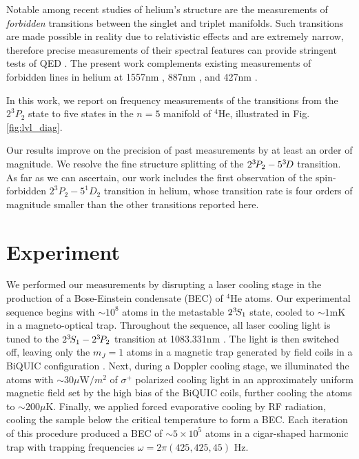   Notable among recent studies of helium's structure are the measurements of \emph{forbidden} transitions between the singlet and triplet manifolds.
	Such transitions are made possible in reality due to relativistic effects and are extremely narrow, therefore precise measurements of their spectral features can provide stringent tests of QED \cite{Lach01}.
	The present work complements existing measurements of forbidden lines in helium at 1557nm \cite{Rooij11,Rengelink18}, 887nm \cite{Notermans14}, and 427nm \cite{Thomas20}.

  In this work, we report on frequency measurements of the transitions from the $2^3P_2$ state to five states in the $n=5$ manifold of $^4$He, illustrated in Fig.
	\ref{fig:lvl_diag}.
	
  Our results improve on the precision of past measurements \cite{Martin60} by at least an order of magnitude.
  We resolve the fine structure splitting of the $2^{3\!}P_2 - 5^{3\!} D$ transition.
	As far as we can ascertain, our work includes the first observation of the spin-forbidden $2^3P_2 - 5^1D_2$ transition in helium, whose transition rate is four orders of magnitude smaller than the other transitions reported here.

  

\section{Experiment}

We performed our measurements by disrupting a laser cooling stage in the production of a Bose-Einstein condensate (BEC) of $^{4}\textrm{He}$ atoms.
	Our experimental sequence begins with $\sim10^8$ atoms in the metastable $2^{3\!} S_1$ state, cooled to  $\sim1 \textrm{mK}$ in a magneto-optical trap.
	Throughout the sequence, all laser cooling light is tuned to the $2^{3\!} S_1 - 2^{3\!} P_2$ transition at 1083.331nm \cite{Shin16}.
	The light is then switched off, leaving only the $m_J=1$ atoms in a magnetic trap generated by field coils in a BiQUIC configuration \cite{Dall07}.
	Next, during a Doppler cooling stage, we illuminated the atoms with $\sim$30$\mu$W$/m^2$ of $\sigma^+$ polarized cooling light in an approximately uniform magnetic field set by the high bias of the BiQUIC coils, further cooling the atoms to $\sim200\mu \textrm{K}$.
	Finally, we applied forced evaporative cooling by RF radiation, cooling the sample below the critical temperature to form a BEC.
	Each iteration of this procedure produced a BEC of $\sim 5\times10^5$ atoms in a cigar-shaped harmonic trap with trapping frequencies $\omega = 2\pi (425,425,45)$ Hz.
	

